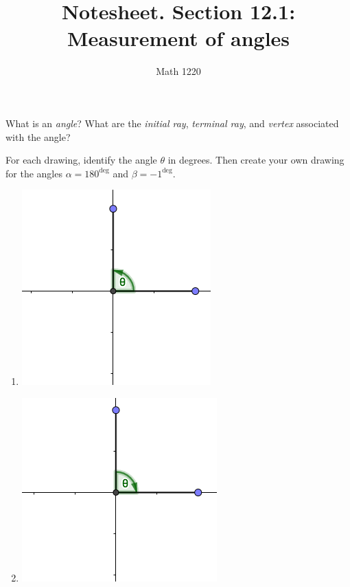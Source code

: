 \documentclass[12pt, a4paper]{article}
\author{Math 1220}
\title{Notesheet. Section 12.1: Measurement of angles}
\date{}
\begin{document}
\maketitle
\nameline
\begin{defi}
  What is an \emph{angle}?  What are the \emph{initial ray}, \emph{terminal ray}, and \emph{vertex} associated with the angle?
\end{defi}
\vs\vs
\begin{ex}
  For each drawing, identify the angle $\theta$ in degrees.  Then
  create your own drawing for the angles $\alpha = 180^\deg$ and
  $\beta = -1^\deg$.\\
  \begin{minipage}{0.5\linewidth}
  \begin{enumerate}
    \item \includegraphics[scale=0.40]{images/angle-1-digital}
    \item \includegraphics[scale=0.40]{images/angle-2-digital}
  \end{enumerate}  
  \end{minipage}
  \begin{minipage}{0.5\linewidth}

\end{minipage}
\end{ex}
\end{document}
